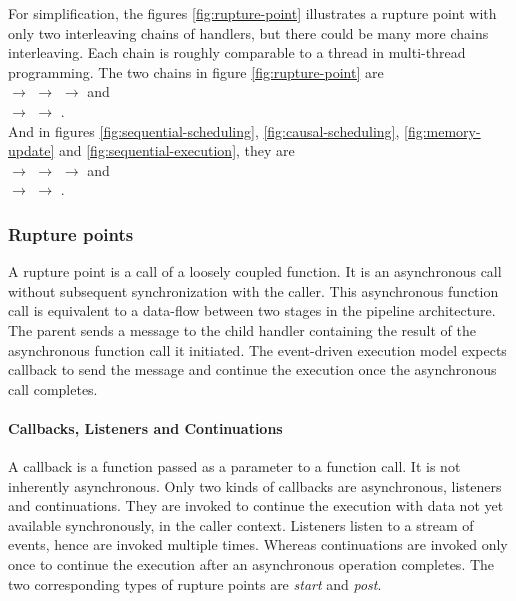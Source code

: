 For simplification, the figures \ref{fig:rupture-point} illustrates a rupture point with only two interleaving chains of handlers, but there could be many more chains interleaving.
Each chain is roughly comparable to a thread in multi-thread programming.
The two chains in figure \ref{fig:rupture-point} are \\
$\to$
 $\to$
 $\to$ and \\
\dotcircled{\textcolor{white}{0}} $\to$
\dotcircled{\textcolor{white}{0}} $\to$
\dotcircled{\textcolor{white}{0}}.\\
And in figures \ref{fig:sequential-scheduling},  \ref{fig:causal-scheduling}, \ref{fig:memory-update} and \ref{fig:sequential-execution}, they are \\
$\to$
 $\to$
 $\to$ and \\
\dotcircled{\textcolor{white}{0}} $\to$
 $\to$
\dotcircled{\textcolor{white}{0}}.

\subsubsection{Rupture points} \label{chapter5:flx-compiler:analyzer:rupture}

A rupture point is a call of a loosely coupled function.
It is an asynchronous call without subsequent synchronization with the caller.
This asynchronous function call is equivalent to a data-flow between two stages in the pipeline architecture.
The parent sends a message to the child handler containing the result of the asynchronous function call it initiated.
The event-driven execution model expects callback to send the message and continue the execution once the asynchronous call completes.

\paragraph{Callbacks, Listeners and Continuations}

A callback is a function passed as a parameter to a function call.
It is not inherently asynchronous.
Only two kinds of callbacks are asynchronous, listeners and continuations.
They are invoked to continue the execution with data not yet available synchronously, in the caller context.
Listeners listen to a stream of events, hence are invoked multiple times.
Whereas continuations are invoked only once to continue the execution after an asynchronous operation completes.
The two corresponding types of rupture points are \textit{start} and \textit{post}.

